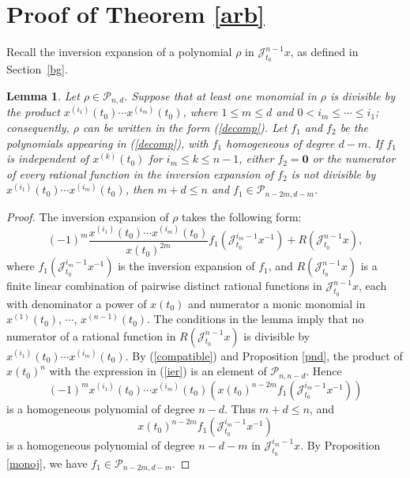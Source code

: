 \documentclass[11pt]{amsart}
\numberwithin{equation}{section}
\newcommand{\di}{\displaystyle}
\newtheorem{lemma}[thm]{Lemma}
\newcommand{\scp}{\mathscr{P}}
\newcommand{\sjt}{\mathscr{J}_{t_0}}
\newcommand{\sjmx}{\mathscr{J}^{n-1}_{t_0} x}
\newcommand{\pnd}{\mathscr{P}_{n, d}}
\newcommand{\zero}{\mathbf{0}}
\begin{document}
\section{Proof of Theorem \ref{arb} \label{proof}}

Recall the inversion expansion of a polynomial $\rho$ in $\sjmx$, as defined in Section~\ref{bg}.

\begin{lemma} \label{estimate}
  Let $\rho\in\pnd$. Suppose that at least one monomial in $\rho$ is divisible by the product
$x^{(i_1)}(t_0)\cdots x^{(i_m)}(t_0)$,
where $1\le m\le d$ and $0<i_m\le\cdots\le i_1$; consequently, $\rho$ can be written in the form (\ref{decomp}).
Let $f_1$ and $f_2$ be the polynomials appearing in (\ref{decomp}), with $f_1$ homogeneous of degree $d-m$.
  If $f_1$ is independent of
$x^{(k)}(t_0)$ for $i_m \le k \le n-1$, either $f_2=\zero$ or the numerator of every
rational function in the
inversion expansion of $f_2$ is not divisible
by $\di x^{(i_1)}(t_0) \cdots x^{(i_m)}(t_0)$,
  then $m+d \le n$  and $f_1 \in \scp_{n-2m, d-m}$.
\end{lemma}
\begin{proof}
  The inversion
  expansion of $\rho$
 takes the following form:
  \begin{equation} \label{ier}
  (-1)^m \frac{x^{(i_1)}(t_0) \cdots x^{(i_m)}(t_0)}{x(t_0)^{2m}} f_1\left(\sjt^{i_m-1} x^{-1} \right)+R(\sjmx),
  \end{equation}
  where $\di f_1( \sjt^{i_m-1}x^{-1})$ is the inversion expansion of $f_1$,
  and $R(\sjmx)$ is a finite linear combination of pairwise distinct rational functions in $\sjmx$,
  each with denominator a power of $x(t_0)$ and numerator a monic monomial in $x^{(1)}(t_0)$, $\cdots$, $x^{(n-1)}(t_0)$.
  The conditions in the lemma imply that no numerator of a rational function in $R(\sjmx)$ is divisible by $\di x^{(i_1)}(t_0)\cdots x^{(i_m)}(t_0)$.
  By (\ref{compatible}) and Proposition \ref{pnd}, the product of $x(t_0)^n$ with the expression in (\ref{ier})
  is an element of $\scp_{n,n-d}$.
  Hence
  $$(-1)^m x^{(i_1)}(t_0) \cdots x^{(i_m)}(t_0) (x(t_0)^{n-2m} f_1(\sjt^{i_m-1} x^{-1}))$$
  is a homogeneous polynomial of degree $n-d$.
  Thus $m+d\le n$, and
  $$x(t_0)^{n-2m}f_1(\sjt^{i_m-1}x^{-1})$$
  is a homogeneous polynomial of degree $n-d-m$ in $\sjt^{i_m-1}x$.
  By Proposition \ref{monoj}, we have $f_1\in\scp_{n-2m,d-m}$.
  \end{proof}
\end{document}

